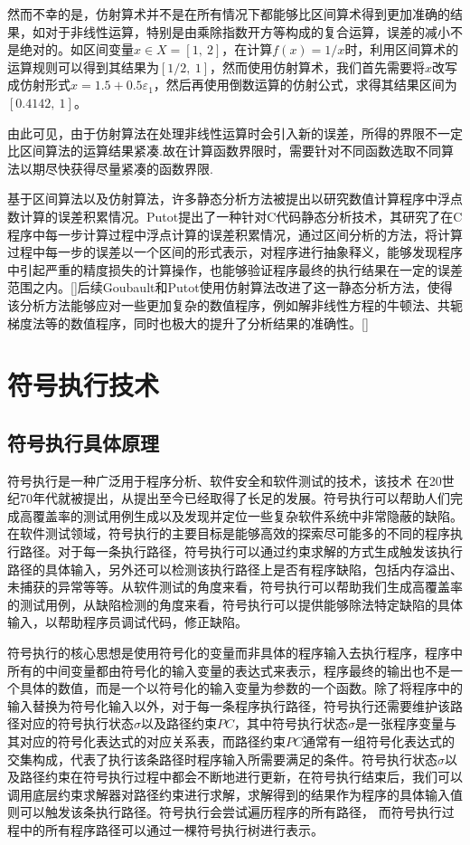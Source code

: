 然而不幸的是，仿射算术并不是在所有情况下都能够比区间算术得到更加准确的结果，如对于非线性运算，特别是由乘除指数开方等构成的复合运算，误差的减小不是绝对的。如区间变量$x \in X = [1,\ 2]$，在计算$f(x) = 1/x$时，利用区间算术的运算规则可以得到其结果为$[1/2 ,\ 1]$，然而使用仿射算术，我们首先需要将$x$改写成仿射形式$\hat{x} = 1.5 + 0.5\varepsilon_1$，然后再使用倒数运算的仿射公式，求得其结果区间为$[0.4142,\ 1]$。

由此可见，由于仿射算法在处理非线性运算时会引入新的误差，所得的界限不一定比区间算法的运算结果紧凑.故在计算函数界限时，需要针对不同函数选取不同算法以期尽快获得尽量紧凑的函数界限.

基于区间算法以及仿射算法，许多静态分析方法被提出以研究数值计算程序中浮点数计算的误差积累情况。Putot提出了一种针对C代码静态分析技术，其研究了在C程序中每一步计算过程中浮点计算的误差积累情况，通过区间分析的方法，将计算过程中每一步的误差以一个区间的形式表示，对程序进行抽象释义，能够发现程序中引起严重的精度损失的计算操作，也能够验证程序最终的执行结果在一定的误差范围之内。[]后续Goubault和Putot使用仿射算法改进了这一静态分析方法，使得该分析方法能够应对一些更加复杂的数值程序，例如解非线性方程的牛顿法、共轭梯度法等的数值程序，同时也极大的提升了分析结果的准确性。[]


\section{符号执行技术}

\subsection{符号执行具体原理}

符号执行是一种广泛用于程序分析、软件安全和软件测试的技术，该技术 在20世纪70年代就被提出，从提出至今已经取得了长足的发展。符号执行可以帮助人们完成高覆盖率的测试用例生成以及发现并定位一些复杂软件系统中非常隐蔽的缺陷。在软件测试领域，符号执行的主要目标是能够高效的探索尽可能多的不同的程序执行路径。对于每一条执行路径，符号执行可以通过约束求解的方式生成触发该执行路径的具体输入，另外还可以检测该执行路径上是否有程序缺陷，包括内存溢出、未捕获的异常等等。从软件测试的角度来看，符号执行可以帮助我们生成高覆盖率的测试用例，从缺陷检测的角度来看，符号执行可以提供能够除法特定缺陷的具体输入，以帮助程序员调试代码，修正缺陷。

符号执行的核心思想是使用符号化的变量而非具体的程序输入去执行程序，程序中所有的中间变量都由符号化的输入变量的表达式来表示，程序最终的输出也不是一个具体的数值，而是一个以符号化的输入变量为参数的一个函数。除了将程序中的输入替换为符号化输入以外，对于每一条程序执行路径，符号执行还需要维护该路径对应的符号执行状态$\sigma$以及路径约束$PC$，其中符号执行状态$\sigma$是一张程序变量与其对应的符号化表达式的对应关系表，而路径约束$PC$通常有一组符号化表达式的交集构成，代表了执行该条路径时程序输入所需要满足的条件。符号执行状态$\sigma$以及路径约束在符号执行过程中都会不断地进行更新，在符号执行结束后，我们可以调用底层约束求解器对路径约束进行求解，求解得到的结果作为程序的具体输入值则可以触发该条执行路径。符号执行会尝试遍历程序的所有路径， 而符号执行过程中的所有程序路径可以通过一棵符号执行树进行表示。

